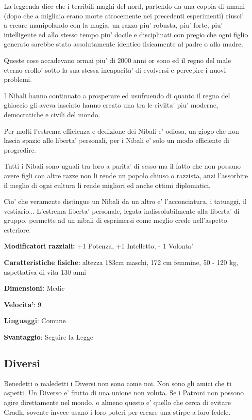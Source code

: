 \documentclass[a4paper,11pt,twoside,openany]{book}
\begin{document}
La leggenda dice che i terribili maghi del nord, partendo da una coppia di umani (dopo che a migliaia erano morte atrocemente nei precedenti esperimenti) riusci' a creare manipolando con la magia, un razza piu' robusta, piu' forte, piu' intelligente ed allo stesso tempo piu' docile e disciplinati con pregio che ogni figlio generato sarebbe stato assolutamente identico fisicamente al padre o alla madre.

Queste cose accadevano ormai piu' di 2000 anni or sono ed il regno del male eterno crollo' sotto la sua stessa incapacita' di evolversi e percepire i nuovi problemi.

I Nibali hanno continuato a prosperare ed usufruendo di quanto il regno del ghiaccio gli aveva lasciato hanno creato una tra le civilta' piu' moderne, democratiche e civili del mondo.

Per molti l'estrema efficienza e dedizione dei Nibali e' odiosa, un giogo che non lascia spazio alle liberta' personali, per i Nibali e' solo un modo efficiente di progredire.

Tutti i Nibali sono uguali tra loro a parita' di sesso ma il fatto che non possano avere figli con altre razze non li rende un popolo chiuso o razzista, anzi l'assorbire il meglio di ogni cultura li rende migliori ed anche ottimi diplomatici. 

Cio' che veramente distingue un Nibali da un altro e' l'acconciatura, i tatuaggi, il vestiario... L'estrema liberta' personale, legata indissolubilmente alla liberta' di gruppo, permette ad un nibali di esprimersi come meglio crede nell'aspetto esteriore.

\textbf{Modificatori razziali:} +1 Potenza, +1 Intelletto, - 1 Volonta'

\textbf{Caratteristiche fisiche}: altezza 183cm maschi, 172 cm femmine, 50 - 120 kg, aspettativa di vita 130 anni

\textbf{Dimensioni:} Medie

\textbf{Velocita'}: 9

\textbf{Linguaggi}: Comune

\textbf{Svantaggio}: Seguire la Legge

\subsection{Diversi}

\label{diversi}

Benedetti o maledetti i Diversi non sono come noi. Non sono gli amici che ti aspetti. Un Diverso e' frutto di una unione non voluta. Se i Patroni non possono agire direttamente nel mondo, o almeno questo e' quello che cerca di evitare Gradh, sovente invece usano i loro poteri per creare una stirpe a loro fedele.
\end{document}
